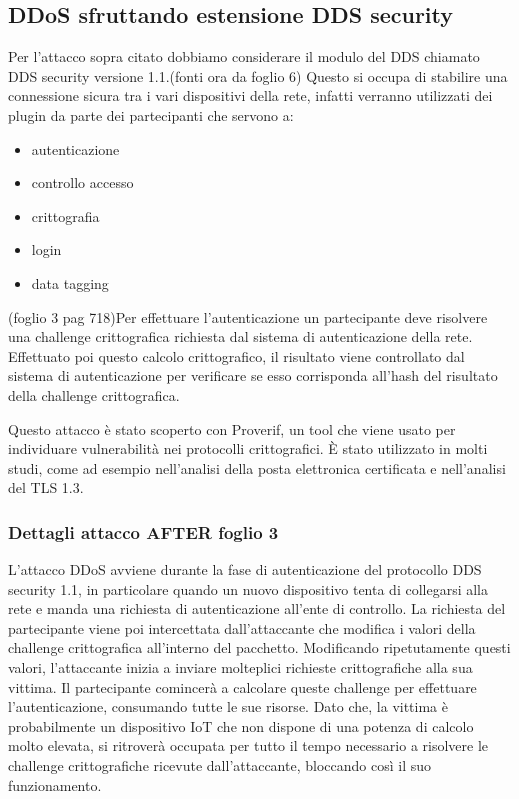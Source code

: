 \subsection{DDoS sfruttando estensione DDS security}
Per l'attacco sopra citato dobbiamo considerare il modulo del DDS 
chiamato DDS security
versione 1.1.(fonti ora da foglio 6) Questo si occupa di stabilire una
connessione sicura tra i vari dispositivi della rete, infatti verranno utilizzati
dei plugin da parte dei partecipanti che servono a: 
\begin{itemize}
    \item autenticazione
    \item controllo accesso
    \item crittografia
    \item login
    \item data tagging
\end{itemize}
(foglio 3 pag 718)Per effettuare l'autenticazione un partecipante deve
risolvere una challenge crittografica richiesta dal sistema di autenticazione
della rete. Effettuato poi questo calcolo crittografico, il risultato viene
controllato dal sistema di autenticazione per verificare se esso corrisponda
all'hash del risultato della challenge crittografica.

Questo attacco è stato scoperto con Proverif, un tool che viene usato
per individuare vulnerabilità nei protocolli crittografici. 
È stato utilizzato in molti studi, come ad esempio nell'analisi della 
posta elettronica certificata e nell'analisi del TLS 1.3.

\subsubsection{Dettagli attacco AFTER foglio 3}
L'attacco DDoS avviene durante la fase di autenticazione del protocollo
DDS security 1.1, in particolare quando un nuovo dispositivo tenta di
collegarsi alla rete e manda una richiesta di autenticazione
all'ente di controllo. La richiesta del partecipante viene poi intercettata
dall'attaccante che modifica i valori della challenge crittografica 
all'interno del pacchetto. Modificando ripetutamente questi valori, l'attaccante
inizia a inviare molteplici richieste crittografiche alla sua vittima.
Il partecipante comincerà a calcolare queste challenge per effettuare
l'autenticazione, consumando tutte le sue risorse.
Dato che, la vittima è probabilmente un dispositivo IoT
che non dispone di una potenza di calcolo molto elevata, si ritroverà
occupata per tutto il tempo necessario a risolvere le challenge crittografiche
ricevute dall'attaccante, bloccando così il suo funzionamento.


